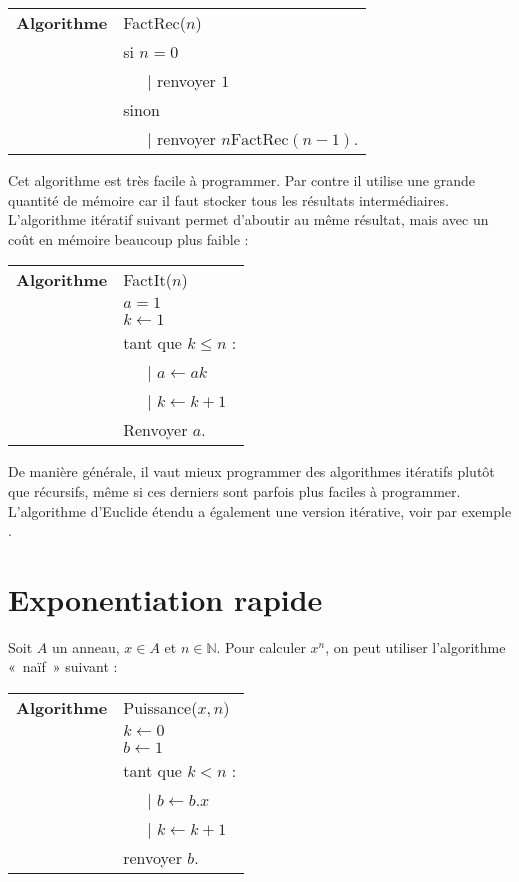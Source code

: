 \documentclass[12pt]{report}
\newcommand{\N}{\mathbb{N}}
\begin{document}
 \begin{tabular}{ll}
\textbf{Algorithme } & FactRec($n$)\\
& si $n=0$\\
& \ \ \ {\rm |}  renvoyer $1$\\
& sinon\\
& \ \ \ {\rm |}  renvoyer $n\mathrm{FactRec}(n-1)$.\\
\end{tabular}

Cet algorithme est très facile à programmer. Par contre il utilise une grande quantité de mémoire car il faut stocker tous les résultats intermédiaires. L'algorithme itératif suivant  permet d'aboutir au même résultat, mais avec un coût en mémoire beaucoup plus faible :

 \begin{tabular}{ll}
\textbf{Algorithme } & FactIt($n$)\\
& $a=1$ \\
& $k\leftarrow 1$\\
& tant que $k\leq n$ :\\
& \ \ \ {\rm |} $a\leftarrow ak$\\
& \ \ \ {\rm |} $k\leftarrow k+1$\\
& Renvoyer $a$.
\end{tabular}

De manière générale, il vaut mieux programmer des algorithmes itératifs plutôt que récursifs, même si ces derniers sont parfois plus faciles à programmer. L'algorithme d'Euclide étendu a également une version itérative, voir par exemple \cite{demazure2008cours}.

\section{Exponentiation rapide}

Soit $A$ un anneau, $x\in A$ et $n\in \N$. Pour calculer $x^n$, on peut utiliser l'algorithme «~naïf~» suivant : 

\begin{tabular}{ll}
\textbf{Algorithme } & Puissance($x,n$)\\
& $k\leftarrow 0$ \\
& $b\leftarrow 1$ \\
& tant que $k<n$ :\\
& \ \ \ {\rm |} $b\leftarrow b.x$  \\
& \ \ \ {\rm |} $k\leftarrow k+1$  \\
& renvoyer $b$.
\end{tabular}
 
\end{document}
